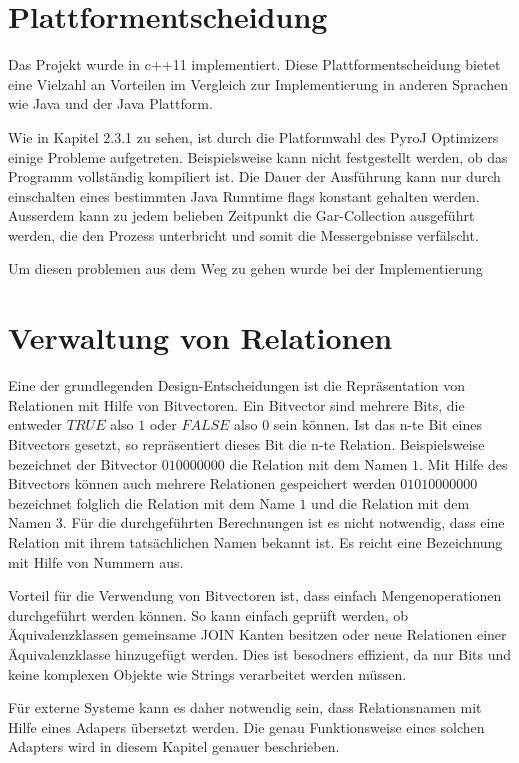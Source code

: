 \section{Plattformentscheidung}

Das Projekt wurde in c++11 implementiert. Diese Plattformentscheidung bietet eine Vielzahl an Vorteilen im Vergleich zur Implementierung in anderen Sprachen wie Java und der Java Plattform.

Wie in Kapitel 2.3.1 zu sehen, ist durch die Platformwahl des PyroJ Optimizers einige Probleme aufgetreten. Beispielsweise kann nicht festgestellt werden, ob das Programm vollständig kompiliert ist. Die Dauer der Ausführung kann nur durch einschalten eines bestimmten Java Runntime flags konstant gehalten werden. Ausserdem kann zu jedem belieben Zeitpunkt die Gar-Collection ausgeführt werden, die den Prozess unterbricht und somit die Messergebnisse verfälscht.

Um diesen problemen aus dem Weg zu gehen wurde bei der Implementierung


\section{Verwaltung von Relationen}

Eine der grundlegenden Design-Entscheidungen ist die Repräsentation von Relationen mit Hilfe von Bitvectoren. Ein Bitvector sind mehrere Bits, die entweder $TRUE$ also $1$ oder $FALSE$ also $0$ sein können. Ist das n-te Bit eines Bitvectors gesetzt, so repräsentiert dieses Bit die n-te Relation. Beispielsweise bezeichnet der Bitvector $010000000$ die Relation mit dem Namen $1$. Mit Hilfe des Bitvectors können auch mehrere Relationen gespeichert werden $01010000000$ bezeichnet folglich die Relation mit dem Name $1$ und die Relation mit dem Namen $3$. Für die durchgeführten Berechnungen ist es nicht notwendig, dass eine Relation mit ihrem tatsächlichen Namen bekannt ist. Es reicht eine Bezeichnung mit Hilfe von Nummern aus.

Vorteil für die Verwendung von Bitvectoren ist, dass einfach Mengenoperationen durchgeführt werden können. So kann einfach geprüft werden, ob Äquivalenzklassen gemeinsame JOIN Kanten besitzen oder neue Relationen einer Äquivalenzklasse hinzugefügt werden. Dies ist besodners effizient, da nur Bits und keine komplexen Objekte wie Strings verarbeitet werden müssen.


Für externe Systeme kann es daher notwendig sein, dass Relationsnamen mit Hilfe eines Adapers übersetzt werden. Die genau Funktionsweise eines solchen Adapters wird in diesem Kapitel genauer beschrieben.


